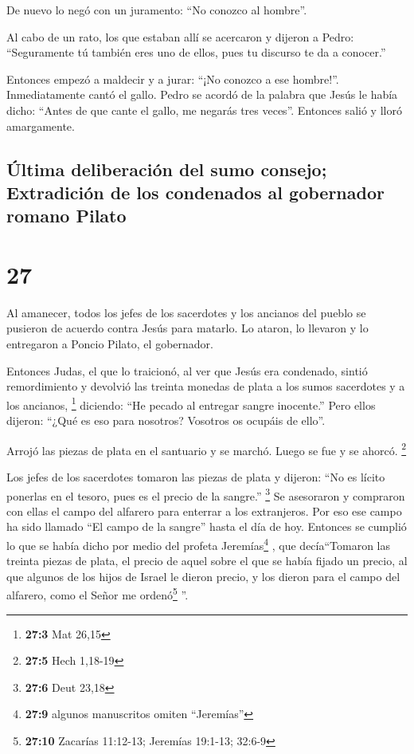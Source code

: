  De nuevo lo negó con un juramento: ``No conozco al
hombre''.

 Al cabo de un rato, los que estaban allí se acercaron y
dijeron a Pedro: ``Seguramente tú también eres uno de ellos, pues tu
discurso te da a conocer.''

 Entonces empezó a maldecir y a jurar: ``¡No conozco a
ese hombre!''. Inmediatamente cantó el gallo.  Pedro se
acordó de la palabra que Jesús le había dicho: ``Antes de que cante el
gallo, me negarás tres veces''. Entonces salió y lloró amargamente.

\hypertarget{uxfaltima-deliberaciuxf3n-del-sumo-consejo-extradiciuxf3n-de-los-condenados-al-gobernador-romano-pilato}{%
\subsection{Última deliberación del sumo consejo; Extradición de los
condenados al gobernador romano
Pilato}\label{uxfaltima-deliberaciuxf3n-del-sumo-consejo-extradiciuxf3n-de-los-condenados-al-gobernador-romano-pilato}}

\hypertarget{section-26}{%
\section{27}\label{section-26}}

 Al amanecer, todos los jefes de los sacerdotes y los
ancianos del pueblo se pusieron de acuerdo contra Jesús para matarlo.
 Lo ataron, lo llevaron y lo entregaron a Poncio Pilato,
el gobernador.

 Entonces Judas, el que lo traicionó, al ver que Jesús era
condenado, sintió remordimiento y devolvió las treinta monedas de plata
a los sumos sacerdotes y a los ancianos, \footnote{\textbf{27:3} Mat
  26,15}  diciendo: ``He pecado al entregar sangre
inocente.'' Pero ellos dijeron: ``¿Qué es eso para nosotros? Vosotros os
ocupáis de ello''.

 Arrojó las piezas de plata en el santuario y se marchó.
Luego se fue y se ahorcó. \footnote{\textbf{27:5} Hech 1,18-19}

 Los jefes de los sacerdotes tomaron las piezas de plata y
dijeron: ``No es lícito ponerlas en el tesoro, pues es el precio de la
sangre.'' \footnote{\textbf{27:6} Deut 23,18}  Se
asesoraron y compraron con ellas el campo del alfarero para enterrar a
los extranjeros.  Por eso ese campo ha sido llamado ``El
campo de la sangre'' hasta el día de hoy.  Entonces se
cumplió lo que se había dicho por medio del profeta Jeremías\footnote{\textbf{27:9}
  algunos manuscritos omiten ``Jeremías''} , que decía``Tomaron las
treinta piezas de plata, el precio de aquel sobre el que se había fijado
un precio, al que algunos de los hijos de Israel le dieron precio,
 y los dieron para el campo del alfarero, como el Señor
me ordenó\footnote{\textbf{27:10} Zacarías 11:12-13; Jeremías 19:1-13;
  32:6-9} ''.

